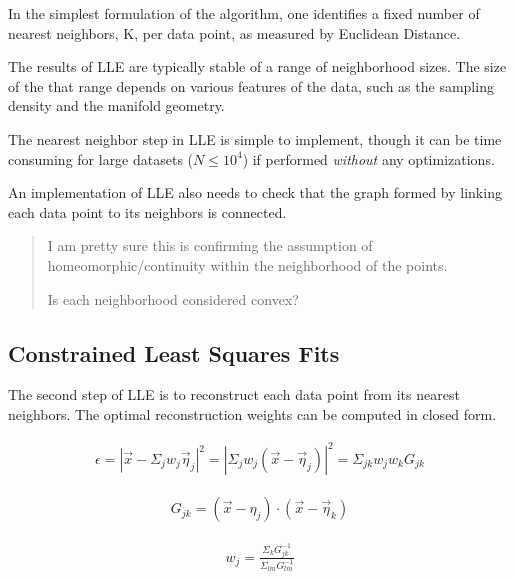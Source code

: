 \documentclass[11pt]{article}
\begin{document}
In the simplest formulation of the algorithm, one identifies a fixed number of
nearest neighbors, K, per data point, as measured by Euclidean Distance.

The results of LLE are typically stable of a range of neighborhood sizes. The
size of the that range depends on various features of the data, such as the
sampling density and the manifold geometry.

The nearest neighbor step in LLE is simple to implement, though it can be time
consuming for large datasets (\(N \leq 10^4\)) if performed \emph{without} any optimizations.

An implementation of LLE also needs to check that the graph formed by linking
each data point to its neighbors is connected.

\begin{quote}
I am pretty sure this is confirming the assumption of homeomorphic/continuity
within the neighborhood of the points.

Is each neighborhood considered convex?
\end{quote}
\subsection{Constrained Least Squares Fits}
\label{sec:org5cbf4cc}

The second step of LLE is to reconstruct each data point from its nearest
neighbors. The optimal reconstruction weights can be computed in closed form.

\begin{equation}
\begin{split}
\label{eq:3}
\epsilon = |\vec x - \Sigma_j w_j \vec \eta_j|^2 = |\Sigma_j w_j (\vec x - \vec \eta_j)|^2 = \Sigma_{jk} w_j w_k G_{jk}
\end{split}
\end{equation}

\begin{equation}
\begin{split}
\label{eq:4}
G_{jk} = (\vec x - \eta_j) \cdot (\vec x - \vec \eta_k)
\end{split}
\end{equation}

\begin{equation}
\begin{split}
\label{eq:5}
w_j = \frac{\Sigma_k G_{jk}^{-1}}{\Sigma_{lm} G_{lm}^{-1}}
\end{split}
\end{equation}
\end{document}
